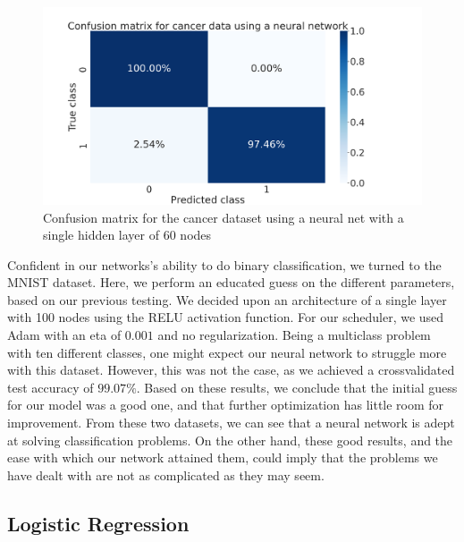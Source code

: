 \documentclass[onecolumn,10pt,cleanfoot]{asme2ej}
\begin{document}
\begin{figure}[H]
\centerline{\includegraphics[width=5in]{figure/conf_mat_NN_cancer.png}}
\caption{Confusion matrix for the cancer dataset using a neural net with a single hidden layer of 60 nodes}
\label{cancerconf}
\end{figure}

Confident in our networks's ability to do binary classification, we turned to the MNIST dataset. Here, we perform an educated guess on the different parameters, based on our previous testing. We decided upon an architecture of a single layer with 100 nodes using the RELU activation function. For our scheduler, we used Adam with an eta of $0.001$ and no regularization. Being a multiclass problem with ten different classes, one might expect our neural network to struggle more with this dataset. However, this was not the case, as we achieved a crossvalidated test accuracy of $99.07\%$. Based on these results, we conclude that the initial guess for our model was a good one, and that further optimization has little room for improvement. From these two datasets, we can see that a neural network is adept at solving classification problems. On the other hand, these good results, and the ease with which our network attained them, could imply that the problems we have dealt with are not as complicated as they may seem.

\subsection{Logistic Regression}
\end{document}
